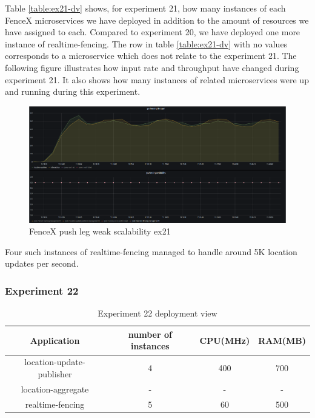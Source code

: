 \documentclass[a4]{report}
\begin{document}
    Table \ref{table:ex21-dv} shows, for experiment 21, how many instances of each FenceX microservices we have
    deployed in addition to the amount of resources we have assigned to each.
    Compared to experiment 20, we have deployed one more instance of realtime-fencing.
    The row in table \ref{table:ex21-dv} with no values corresponds to a microservice which does not relate to the
    experiment 21.
    The following figure illustrates how input rate and throughput have changed during experiment 21.
    It also shows how many instances of related microservices were up and running during this experiment.

    \begin{figure}[h!]
        \centering
        \caption{FenceX push leg weak scalability ex21}
        \label{fig:ex21}
        \includegraphics[width=\linewidth, scale=2]{images/evaluation/ex21-benchmarking-ongoing-1per6sec.png}
    \end{figure}
    Four such instances of realtime-fencing managed to handle around 5K location updates per second.

    \clearpage

    \subsubsection{Experiment 22}
    \begin{table}[h!]
        \centering
        \begin{tabular}{|c|c|c|c|}
            \hline
            Application               & number of instances & CPU(MHz) & RAM(MB) \\
            \hline
            location-update-publisher & 4                   & 400      & 700     \\
            location-aggregate        & -                   & -        & -       \\
            realtime-fencing          & 5                   & 60       & 500     \\
            \hline
        \end{tabular}
        \caption{Experiment 22 deployment view}
        \label{table:ex22-dv}
    \end{table}
\end{document}
